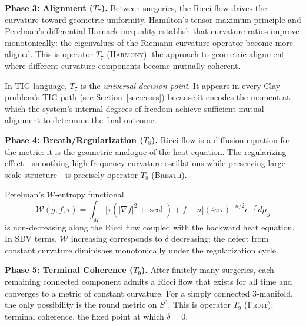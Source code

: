 \documentclass[11pt]{article}
\DeclareMathOperator{\scal}{scal}
\begin{document}
\medskip
\noindent
\textbf{Phase 3: Alignment ($T_7$).}
Between surgeries, the Ricci flow drives the curvature toward
geometric uniformity.  Hamilton's tensor maximum principle and
Perelman's differential Harnack inequality establish that curvature
ratios improve monotonically: the eigenvalues of the Riemann curvature
operator become more aligned.  This is operator $T_7$
(\textsc{Harmony}): the approach to geometric alignment where
different curvature components become mutually coherent.

In TIG language, $T_7$ is the \emph{universal decision point}.  It
appears in every Clay problem's TIG path (see Section~\ref{sec:cross})
because it encodes the moment at which the system's internal degrees
of freedom achieve sufficient mutual alignment to determine the final
outcome.

\medskip
\noindent
\textbf{Phase 4: Breath/Regularization ($T_8$).}
Ricci flow is a diffusion equation for the metric: it is the geometric
analogue of the heat equation.  The regularizing effect---smoothing
high-frequency curvature oscillations while preserving large-scale
structure---is precisely operator $T_8$ (\textsc{Breath}).

Perelman's $\mathcal{W}$-entropy functional \cite{Per1}
\begin{equation}
\label{eq:W}
\mathcal{W}(g, f, \tau) = \int_M
\bigl[\tau(|\nabla f|^2 + \scal) + f - n\bigr]
(4\pi\tau)^{-n/2} e^{-f}\, d\mu_g
\end{equation}
is non-decreasing along the Ricci flow coupled with the backward heat
equation.  In SDV terms, $\mathcal{W}$ increasing corresponds to
$\delta$ decreasing: the defect from constant curvature diminishes
monotonically under the regularization cycle.

\medskip
\noindent
\textbf{Phase 5: Terminal Coherence ($T_9$).}
After finitely many surgeries, each remaining connected component
admits a Ricci flow that exists for all time and converges to a
metric of constant curvature.  For a simply connected 3-manifold,
the only possibility is the round metric on $S^3$.  This is operator
$T_9$ (\textsc{Fruit}): terminal coherence, the fixed point at which
$\delta = 0$.
\end{document}
